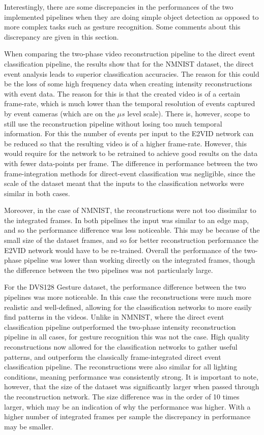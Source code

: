 Interestingly, there are some discrepancies in the performances of the two implemented pipelines when they are doing simple object detection as opposed to more complex tasks such as gesture recognition. Some comments about this discrepancy are given in this section.

When comparing the two-phase video reconstruction pipeline to the direct event classification pipeline, the results show that for the NMNIST dataset, the direct event analysis leads to superior classification accuracies. The reason for this could be the loss of some high frequency data when creating intensity reconstructions with event data. The reason for this is that the created video is of a certain frame-rate, which is much lower than the temporal resolution of events captured by event cameras (which are on the $ \mu s $ level scale). There is, however, scope to still use the reconstruction pipeline without losing too much temporal information. For this the number of events per input to the E2VID network can be reduced so that the resulting video is of a higher frame-rate. However, this would require for the network to be retrained to achieve good results on the data with fewer data-points per frame. The difference in performance between the two frame-integration methods for direct-event classification was negligible, since the scale of the dataset meant that the inputs to the classification networks were similar in both cases.

Moreover, in the case of NMNIST, the reconstructions were not too dissimilar to the integrated frames. In both pipelines the input was similar to an edge map, and so the performance difference was less noticeable. This may be because of the small size of the dataset frames, and so for better reconstruction performance the E2VID network would have to be re-trained. Overall the performance of the two-phase pipeline was lower than working directly on the integrated frames, though the difference between the two pipelines was not particularly large.

For the DVS128 Gesture dataset, the performance difference between the two pipelines was more noticeable. In this case the reconstructions were much more realistic and well-defined, allowing for the classification networks to more easily find patterns in the videos. Unlike in NMNIST, where the direct event classification pipeline outperformed the two-phase intensity reconstruction pipeline in all cases, for gesture recognition this was not the case. High quality reconstructions now allowed for the classification networks to gather useful patterns, and outperform the classically frame-integrated direct event classification pipeline. The reconstructions were also similar for all lighting conditions, meaning performance was consistently strong. It is important to note, however, that the size of the dataset was significantly larger when passed through the reconstruction network. The size difference was in the order of 10 times larger, which may be an indication of why the performance was higher. With a higher number of integrated frames per sample the discrepancy in performance may be smaller.

